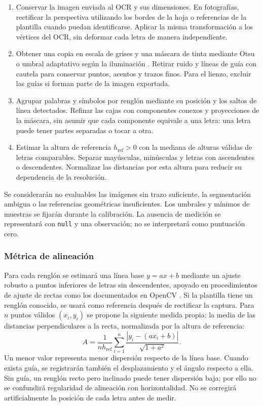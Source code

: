 \begin{enumerate}
    \item Conservar la imagen enviada al OCR y sus dimensiones. En fotografías, rectificar la perspectiva utilizando los bordes de la hoja o referencias de la plantilla cuando puedan identificarse. Aplicar la misma transformación a los vértices del OCR, sin deformar cada letra de manera independiente.
    \item Obtener una copia en escala de grises y una máscara de tinta mediante Otsu o umbral adaptativo según la iluminación \cite{otsu1979threshold,opencvMetricas}. Retirar ruido y líneas de guía con cautela para conservar puntos, acentos y trazos finos. Para el lienzo, excluir las guías si forman parte de la imagen exportada.
    \item Agrupar palabras y símbolos por renglón mediante su posición y los saltos de línea detectados. Refinar las cajas con componentes conexos y proyecciones de la máscara, sin asumir que cada componente equivale a una letra: una letra puede tener partes separadas o tocar a otra.
    \item Estimar la altura de referencia $h_{\mathrm{ref}}>0$ con la mediana de alturas válidas de letras comparables. Separar mayúsculas, minúsculas y letras con ascendentes o descendentes. Normalizar las distancias por esta altura para reducir su dependencia de la resolución.
\end{enumerate}

Se considerarán no evaluables las imágenes sin trazo suficiente, la segmentación ambigua o las referencias geométricas insuficientes. Los umbrales y mínimos de muestras se fijarán durante la calibración. La ausencia de medición se representará con \texttt{null} y una observación; no se interpretará como puntuación cero.

\subsubsection{Métrica de alineación}
Para cada renglón se estimará una línea base $y=ax+b$ mediante un ajuste robusto a puntos inferiores de letras sin descendentes, apoyado en procedimientos de ajuste de rectas como los documentados en OpenCV \cite{opencvShape}. Si la plantilla tiene un renglón conocido, se usará como referencia después de rectificar la captura. Para $n$ puntos válidos $(x_i,y_i)$ se propone la siguiente medida propia: la media de las distancias perpendiculares a la recta, normalizada por la altura de referencia:
\begin{equation}
 A=\frac{1}{n h_{\mathrm{ref}}}\sum_{i=1}^{n}
 \frac{|y_i-(ax_i+b)|}{\sqrt{1+a^2}}.
\end{equation}
Un menor valor representa menor dispersión respecto de la línea base. Cuando exista guía, se registrarán también el desplazamiento y el ángulo respecto a ella. Sin guía, un renglón recto pero inclinado puede tener dispersión baja; por ello no se confundirá regularidad de alineación con horizontalidad. No se corregirá artificialmente la posición de cada letra antes de medir.

